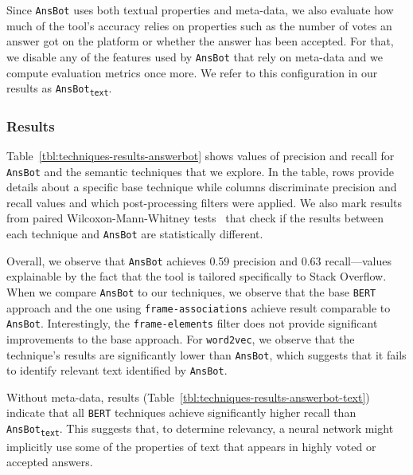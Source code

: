 Since \texttt{AnsBot} uses both textual properties and meta-data, 
we also evaluate how much of the tool's accuracy relies on properties such as the number of votes an answer got on the platform
or whether the answer has been accepted.
For that, we disable any of the features used by \texttt{AnsBot} that rely on meta-data and we compute evaluation metrics once more.
We refer to this configuration in our results as \texttt{AnsBot\textsubscript{text}}.


\subsubsection{Results}




Table~\ref{tbl:techniques-results-answerbot} shows values of precision and recall for  \texttt{AnsBot} and the semantic techniques that we explore. 
In the table, rows provide details about a specific base technique while columns discriminate 
precision and recall values and which post-processing filters were applied. 
We also mark results from paired Wilcoxon-Mann-Whitney tests~\cite{mannWhitneyU} 
that check if the results between each technique and \texttt{AnsBot} are statistically different.





Overall, we observe that \texttt{AnsBot} achieves 0.59 precision and 0.63 recall---values explainable by the fact that the tool is tailored specifically to Stack Overflow.
When we compare \texttt{AnsBot} to our techniques, we observe that the base
 \texttt{BERT} approach and the one using \texttt{frame-associations} achieve result comparable to \texttt{AnsBot}. Interestingly, the \texttt{frame-elements} filter does not provide significant improvements to the base approach. 
For \texttt{word2vec}, we observe that the technique's results are significantly lower than \texttt{AnsBot}, which suggests that it fails to identify relevant text identified by \texttt{AnsBot}. 


Without meta-data, 
results (Table~\ref{tbl:techniques-results-answerbot-text})
 indicate that
all \texttt{BERT} techniques
achieve significantly higher recall than \texttt{AnsBot\textsubscript{text}}.
This suggests that, to determine relevancy, a neural network might implicitly 
use some of the properties of text that appears in highly voted or accepted answers.


